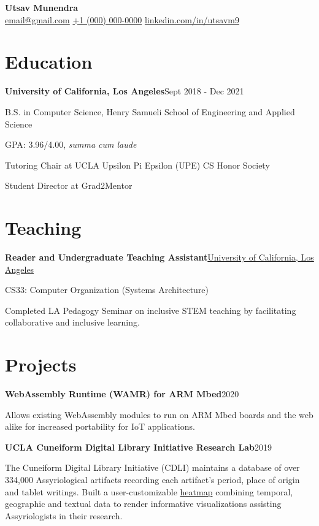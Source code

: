 \documentclass[letterpaper,10pt]{article}
\let\stdtextbf\textbf
\renewcommand{\textbf}[1]{{\fontfamily{bch}\selectfont\stdtextbf{#1}}}
\newlength{\sectiongap}\setlength{\sectiongap}{8pt}
\newlength{\blockgap}\setlength{\blockgap}{6pt}
\newcommand{\name}[1]{{\fontfamily{bch}\fontsize{32pt}{36pt}\bfseries\selectfont #1}}
\newcommand{\sep}{\quad\textbar\quad}
\newenvironment{projectitem}[2]{%
    \textbf{#1}\hfill #2\par
}{%
    \par\vspace{\blockgap}
}
\newenvironment{educationitem}[2]{%
    \textbf{#1}\hfill #2\par
}{%
    \par\vspace{\blockgap}
}
\begin{document}
\begin{center}
    \name{Utsav Munendra}\\[\sectiongap]
    \href{mailto:email@gmail.com}{email@gmail.com}
    \sep
    \href{tel:+10000000000}{+1 (000) 000-0000}
    \sep
    \href{https://linkedin.com/in/utsavm9}{linkedin.com/in/utsavm9}
\end{center}

\section{Education}

\begin{educationitem}{University of California, Los Angeles}{Sept 2018 - Dec 2021}
    B.S. in Computer Science, Henry Samueli School of Engineering and Applied Science \par
    GPA: 3.96/4.00, \textit{summa cum laude} \par
    Tutoring Chair at UCLA Upsilon Pi Epsilon (UPE) CS Honor Society \par
    Student Director at Grad2Mentor \par
\end{educationitem}


\section{Teaching}

\begin{educationitem}{Reader and Undergraduate Teaching Assistant}{\href{https://www.ucla.edu/}{University of California, Los Angeles}}
    CS33: Computer Organization (Systems Architecture) \par
    Completed LA Pedagogy Seminar on inclusive STEM teaching by facilitating collaborative and inclusive learning. \par
\end{educationitem}


\section{Projects}

\begin{projectitem}{WebAssembly Runtime (WAMR) for ARM Mbed}{2020}
    Allows existing WebAssembly modules to run on ARM Mbed boards and the web alike for increased portability for IoT applications.
\end{projectitem}

\begin{projectitem}{UCLA Cuneiform Digital Library Initiative Research Lab}{2019}
    The Cuneiform Digital Library Initiative (CDLI) maintains a database of over 334,000 Assyriological artifacts recording each artifact's period, place of origin and tablet writings. Built a user-customizable \href{https://cdli.earth/heatmap}{heatmap} combining temporal, geographic and textual data to render informative visualizations assisting Assyriologists in their research.
\end{projectitem}
\end{document}

